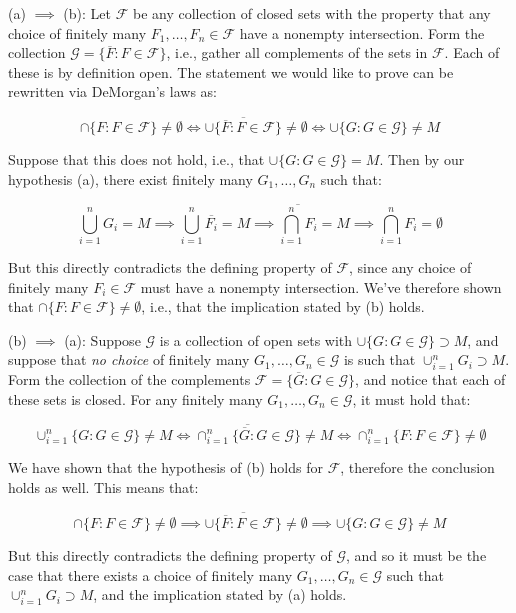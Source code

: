 \begin{solution}
    
    (a) $\implies$ (b): Let $\mathcal{F}$ be any collection of closed sets with the property that any choice of finitely many $F_1, \ldots, F_n \in \mathcal{F}$ have a nonempty intersection.
    Form the collection $\mathcal{G} = \{\overline{F}: F \in \mathcal{F}\}$, i.e., gather all complements of the sets in $\mathcal{F}$.
    Each of these is by definition open.
    The statement we would like to prove can be rewritten via DeMorgan's laws as:

    \[\cap \{F: F \in \mathcal{F} \} \neq \emptyset \iff \overline{\cup\{\overline{F}: F \in \mathcal{F}\}} \neq \emptyset \iff \cup \{G: G \in \mathcal{G} \} \neq M\]

    Suppose that this does not hold, i.e., that $\cup\{G: G \in \mathcal{G}\} = M$.
    Then by our hypothesis (a), there exist finitely many $G_1, \ldots, G_n$ such that:

    \[\bigcup_{i=1}^{n} G_i = M \implies \bigcup_{i=1}^{n} \overline{F_i} = M \implies \overline{\bigcap_{i=1}^{n} F_i} = M \implies \bigcap_{i=1}^{n} F_i = \emptyset\]

    But this directly contradicts the defining property of $\mathcal{F}$, since any choice of finitely many $F_i \in \mathcal{F}$ must have a nonempty intersection.
    We've therefore shown that $\cap\{F: F \in \mathcal{F}\} \neq \emptyset$, i.e., that the implication stated by (b) holds.

    (b) $\implies$ (a): Suppose $\mathcal{G}$ is a collection of open sets with $\cup\{G: G \in \mathcal{G}\} \supset M$, and suppose that \textit{no choice} of finitely many $G_1, \ldots, G_n \in \mathcal{G}$ is such that $\cup_{i=1}^{n} G_i \supset M$.
    Form the collection of the complements $\mathcal{F} = \{\overline{G}: G \in \mathcal{G}\}$, and notice that each of these sets is closed.
    For any finitely many $G_1, \ldots, G_n \in \mathcal{G}$, it must hold that:

    \[\cup_{i=1}^{n} \{G: G \in \mathcal{G}\} \neq M \iff \overline{\cap_{i=1}^{n} \{\overline{G}: G \in \mathcal{G}\}} \neq M \iff \cap_{i=1}^{n} \{F: F \in \mathcal{F}\} \neq \emptyset\]

    We have shown that the hypothesis of (b) holds for $\mathcal{F}$, therefore the conclusion holds as well.
    This means that:

    \[\cap\{F: F \in \mathcal{F}\} \neq \emptyset \implies \overline{\cup\{\overline{F}: F \in \mathcal{F}\}} \neq \emptyset \implies \cup\{G: G \in \mathcal{G}\} \neq M\]

    But this directly contradicts the defining property of $\mathcal{G}$, and so it must be the case that there exists a choice of finitely many $G_1, \ldots, G_n \in \mathcal{G}$ such that $\cup_{i=1}^{n} G_i \supset M$, and the implication stated by (a) holds.
\end{solution}

